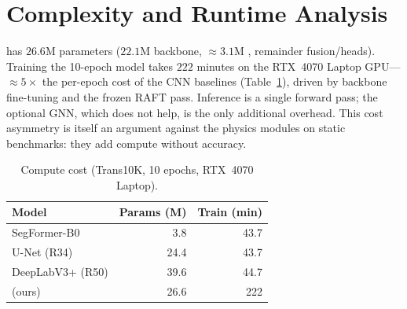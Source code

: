 \section{Complexity and Runtime Analysis}
\spectra{} has $26.6$M parameters ($22.1$M \dinov{} backbone, ${\approx}3.1$M
\ofcv, remainder fusion/heads). Training the 10-epoch model takes $222$ minutes
on the RTX~4070 Laptop GPU---${\approx}5\times$ the per-epoch cost of the CNN
baselines (Table~\ref{tab:cost}), driven by backbone fine-tuning and the frozen
RAFT pass. Inference is a single forward pass; the optional GNN, which does not
help, is the only additional overhead. This cost asymmetry is itself an argument
against the physics modules on static benchmarks: they add compute without
accuracy.

\begin{table}[t]
\centering
\caption{Compute cost (Trans10K, 10 epochs, RTX~4070 Laptop).}
\label{tab:cost}
\begin{tabular}{lrr}
\toprule
Model & Params (M) & Train (min) \\
\midrule
SegFormer-B0 & 3.8 & 43.7 \\
U-Net (R34) & 24.4 & 43.7 \\
DeepLabV3+ (R50) & 39.6 & 44.7 \\
\spectra{} (ours) & 26.6 & 222 \\
\bottomrule
\end{tabular}
\end{table}

